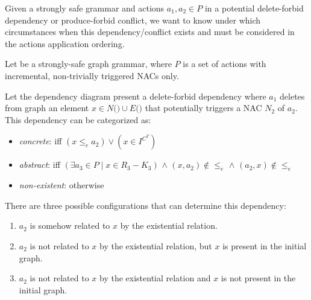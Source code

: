 \begin{intuition}
  Given a strongly safe grammar \doublyTypedGraphGrammarCore{} and actions $a_1, a_2 \in P$ in a potential delete-forbid dependency or produce-forbid conflict, we want to know under which circumstances when this dependency/conflict exists and must be considered in the actions application ordering.
\end{intuition}


\begin{definition} Let \doublyTypedGraphGrammarCore{} be a strongly-safe graph grammar, where $P$ is a set of actions with incremental, non-trivially triggered NACs only.

\hfill

  Let the dependency diagram present a delete-forbid dependency where $a_1$ deletes from graph \coreGraph{} an element $x \in N($\coreGraph$) \cup E($\coreGraph$)$ that potentially triggers a NAC $N_2$ of $a_2$. This dependency can be categorized as:

\begin{itemize}
  \item \emph{concrete}: iff $(x \leq_e a_2) \lor (x \in I^{C^T})$ 
  \item \emph{abstract}: iff $(\exists a_3 \in P \mid x \in R_3 - K_3)$ $\land$ $(x, a_2) \not\in \leq_e$ $\land$ $(a_2, x) \not\in \leq_e$ 
  \item \emph{non-existent}: otherwise
\end{itemize}

\end{definition}

There are three possible configurations that can determine this dependency:

\begin{enumerate}
  \item $a_2$ is somehow related to $x$ by the existential relation.
  \item $a_2$ is not related to $x$ by the existential relation, but $x$ is present in the initial graph.
  \item $a_2$ is not related to $x$ by the existential relation and $x$ is not present in the initial graph.
\end{enumerate}

